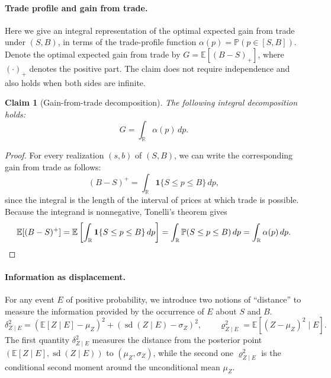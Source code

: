\documentclass[11pt]{article}
\newtheorem{claim}[theorem]{Claim}
\newcommand{\E}[1]{\mathbb E\left[#1\right]}
\renewcommand{\P}[1]{\mathbb P\left(#1\right)}
\DeclareMathOperator{\sd}{sd}
\begin{document}
\paragraph{Trade profile and gain from trade.} {Here we give an integral representation} of the optimal expected gain from trade under $(S,B)$, {in terms of} the trade-profile function $\alpha(p) = \P{p \in [S,B]}.$ Denote the optimal expected gain from trade {by} $G=\E{(B-S)_+}$, where $(\cdot)_+$ denotes the positive part. {The claim} does not require independence and {also holds}
when both sides are infinite.

\begin{claim}[Gain-from-trade decomposition]
\label{cl:decomposition}
The following integral decomposition {holds}:
\[
G=\int_{\mathbb{R}}\alpha(p)\,dp.
\]
\end{claim}

\begin{proof}
For every realization $(s,b)$ of $(S,B)$, we can write the corresponding gain from trade as follows:
\[
(B-S)^+
=\int_{\mathbb{R}}\mathbf{1}\{S\le p\le B\}\,dp,
\]
since the integral is the length of the interval of prices
at which trade is possible.
Because the integrand is nonnegative, Tonelli's theorem gives
\[
    \mathbb{E}[(B-S)^+]
=\mathbb{E}\left[
    \int_{\mathbb{R}}\mathbf{1}\{S\le p\le B\}\,dp
\right]=\int_{\mathbb{R}}\mathbb{P}(S\le p\le B)\,dp
=\int_{\mathbb{R}}\alpha(p)\,dp. \qedhere
\]
\end{proof}

\paragraph{Information as displacement.} For any event $E$ of positive probability, we introduce two notions of {``distance''} to measure the information provided by the {occurrence} of $E$ {about} $S$ and $B$. 
\[
 \delta_{Z\mid E}^2=({\E{Z\mid E}}-\mu_Z)^2+(\sd(Z\mid E)-\sigma_Z)^2,
 \qquad
 \varrho_{Z\mid E}^2={\E{(Z-\mu_Z)^2\mid E}}.
\]
The first quantity $\delta_{Z\mid E}^2$ measures the distance from the posterior point $({\E{Z\mid E}},\sd(Z\mid E))$ to $(\mu_Z,\sigma_Z)$, while the second one $\varrho_{Z\mid E}^2$ is the conditional second moment around the unconditional mean \(\mu_Z\).
\end{document}

